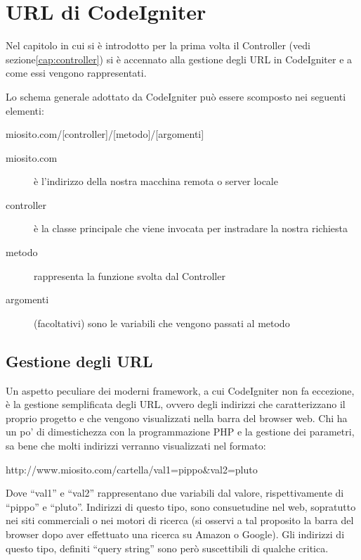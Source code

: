 \chapter{URL di CodeIgniter}
\label{cap:urlr}

Nel capitolo in cui si è introdotto per la prima volta il Controller (vedi sezione\vref{cap:controller}) si è accennato alla gestione degli \ac{URL} in CodeIgniter e a come essi vengono rappresentati.

Lo schema generale adottato da CodeIgniter può essere scomposto nei seguenti elementi:

\begin{code}
miosito.com/[controller]/[metodo]/[argomenti]
\end{code}

\begin{description}
\item [miosito.com] è l'indirizzo della nostra macchina remota o server locale
\item [controller] è la classe principale che viene invocata per instradare la nostra richiesta
\item [metodo] rappresenta la funzione svolta dal Controller 
\item [argomenti] (facoltativi) sono le variabili che vengono passati al metodo
\end{description}

\section*{Gestione degli URL}
Un aspetto peculiare dei moderni framework, a cui CodeIgniter non fa eccezione, è la gestione semplificata degli \ac{URL}, ovvero degli indirizzi che caratterizzano il proprio progetto e che vengono visualizzati nella barra del browser web. Chi ha un po' di dimestichezza con la programmazione \ac{PHP} e la gestione dei parametri, sa bene che molti indirizzi verranno visualizzati nel formato:

\begin{code}
http://www.miosito.com/cartella/val1=pippo&val2=pluto
\end{code}

Dove  ``val1'' e ``val2'' rappresentano due variabili dal valore, rispettivamente di ``pippo'' e ``pluto''. Indirizzi di questo tipo, sono consuetudine nel web, sopratutto nei siti commerciali o nei motori di ricerca (si osservi a tal proposito la barra del browser dopo aver effettuato una ricerca su Amazon o Google). Gli indirizzi di questo tipo, definiti ``query string'' sono però suscettibili di qualche critica.

